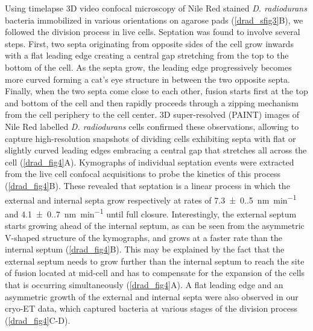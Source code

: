 Using timelapse 3D video confocal microscopy of Nile Red stained \textit{D. radiodurans} bacteria immobilized in various orientations on agarose pads (\autoref{drad_sfig3}B), we followed the division process in live cells.
Septation was found to involve several steps.
First, two septa originating from opposite sides of the cell grow inwards with a flat leading edge creating a central gap stretching from the top to the bottom of the cell.
As the septa grow, the leading edge progressively becomes more curved forming a cat's eye structure in between the two opposite septa.
Finally, when the two septa come close to each other, fusion starts first at the top and bottom of the cell and then rapidly proceeds through a zipping mechanism from the cell periphery to the cell center.
3D super-resolved (PAINT) images of Nile Red labelled \textit{D. radiodurans} cells confirmed these observations, allowing to capture high-resolution snapshots of dividing cells exhibiting septa with flat or slightly curved leading edges embracing a central gap that stretches all across the cell (\autoref{drad_fig4}A).
Kymographs of individual septation events were extracted from the live cell confocal acquisitions to probe the kinetics of this process (\autoref{drad_fig4}B).
These revealed that septation is a linear process in which the external and internal septa grow respectively at rates of \qty{7.3(0.5)}{nm.min^{-1}}  and \qty{4.1(0.7)}{nm.min^{-1}} until full closure.
Interestingly, the external septum starts growing ahead of the internal septum, as can be seen from the asymmetric V-shaped structure of the kymographs, and grows at a faster rate than the internal septum (\autoref{drad_fig4}B).
This may be explained by the fact that the external septum needs to grow further than the internal septum to reach the site of fusion located at mid-cell and has to compensate for the expansion of the cells that is occurring simultaneously (\autoref{drad_fig4}A).
A flat leading edge and an asymmetric growth of the external and internal septa were also observed in our cryo-ET data, which captured bacteria at various stages of the division process (\autoref{drad_fig4}C-D).

